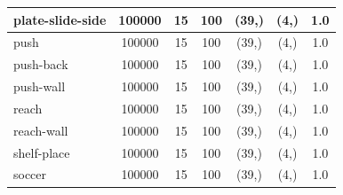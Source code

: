 \documentclass{article}
\theoremstyle{plain}
\theoremstyle{definition}
\theoremstyle{remark}
\begin{document}
\begin{table}[]
{\begin{tabular}{|l|c|c|c|c|c|c|}
plate-slide-side                    & 100000                                        & 15                                                   & 100                                             & (39,)                                           & (4,) & 1.0                                            \\ \hline
push                                & 100000                                        & 15                                                   & 100                                             & (39,)                                           & (4,) & 1.0                                            \\ \hline
push-back                           & 100000                                        & 15                                                   & 100                                             & (39,)                                           & (4,) & 1.0                                            \\ \hline
push-wall                           & 100000                                        & 15                                                   & 100                                             & (39,)                                           & (4,) & 1.0                                            \\ \hline
reach                               & 100000                                        & 15                                                   & 100                                             & (39,)                                           & (4,) & 1.0                                            \\ \hline
reach-wall                          & 100000                                        & 15                                                   & 100                                             & (39,)                                           & (4,) & 1.0                                            \\ \hline
shelf-place                         & 100000                                        & 15                                                   & 100                                             & (39,)                                           & (4,) & 1.0                                            \\ \hline
soccer                              & 100000                                        & 15                                                   & 100                                             & (39,)                                           & (4,) & 1.0                                            \\ \hline

\end{tabular}}
\end{table}
\end{document}
